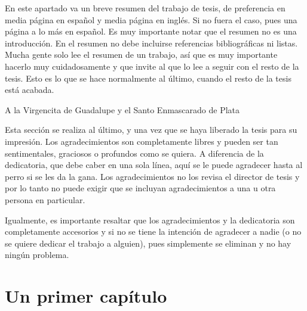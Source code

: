 \documentclass{tesislcc}
\begin{document}

\frontcover

\frontmatter

\begin{summary}
En este apartado va un breve resumen del trabajo de tesis, de preferencia en media página en 
español y media página en inglés. Si no fuera el caso, pues una página a lo más en español. Es muy 
importante notar que el resumen no es una introducción. En el resumen no debe incluirse 
referencias bibliográficas ni listas. Mucha gente solo lee el resumen de un trabajo, así que es 
muy importante hacerlo muy cuidadosamente y que invite al que lo lee a seguir con el resto de la 
tesis. Esto es lo que se hace normalmente al último, cuando el resto de la tesis está acabada.
\end{summary}

\begin{dedication}
A la Virgencita de Guadalupe y el Santo Enmascarado de Plata
\end{dedication}

\begin{acknowledgements}
Esta sección se realiza al último, y una vez que se haya liberado la
tesis para su impresión. Los agradecimientos son completamente libres y pueden ser tan 
sentimentales, graciosos o profundos como se quiera. A diferencia de la dedicatoria, que debe 
caber en una sola línea, aquí se le puede agradecer hasta al perro si se les da la gana. Los 
agradecimientos no los revisa el director de tesis y por lo tanto no puede exigir que se incluyan 
agradecimientos a una u otra
persona en particular.

Igualmente, es importante resaltar que los agradecimientos y la
dedicatoria son completamente accesorios y si no se tiene la intención de agradecer a nadie (o no 
se quiere dedicar el trabajo a alguien), pues simplemente se eliminan y no hay ningún problema.
\end{acknowledgements}

\tableofcontents

\mainmatter

\introduccion


\chapter{Un primer capítulo}

\end{document}
